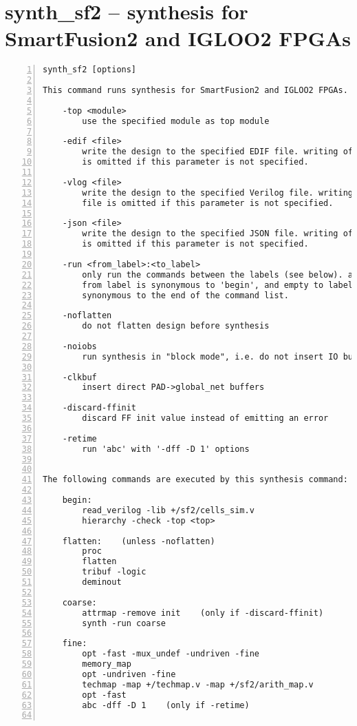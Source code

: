 \section{synth\_sf2 -- synthesis for SmartFusion2 and IGLOO2 FPGAs}
\label{cmd:synth_sf2}
\begin{lstlisting}[numbers=left,frame=single]
    synth_sf2 [options]

This command runs synthesis for SmartFusion2 and IGLOO2 FPGAs.

    -top <module>
        use the specified module as top module

    -edif <file>
        write the design to the specified EDIF file. writing of an output file
        is omitted if this parameter is not specified.

    -vlog <file>
        write the design to the specified Verilog file. writing of an output
        file is omitted if this parameter is not specified.

    -json <file>
        write the design to the specified JSON file. writing of an output file
        is omitted if this parameter is not specified.

    -run <from_label>:<to_label>
        only run the commands between the labels (see below). an empty
        from label is synonymous to 'begin', and empty to label is
        synonymous to the end of the command list.

    -noflatten
        do not flatten design before synthesis

    -noiobs
        run synthesis in "block mode", i.e. do not insert IO buffers

    -clkbuf
        insert direct PAD->global_net buffers

    -discard-ffinit
        discard FF init value instead of emitting an error

    -retime
        run 'abc' with '-dff -D 1' options


The following commands are executed by this synthesis command:

    begin:
        read_verilog -lib +/sf2/cells_sim.v
        hierarchy -check -top <top>

    flatten:    (unless -noflatten)
        proc
        flatten
        tribuf -logic
        deminout

    coarse:
        attrmap -remove init    (only if -discard-ffinit)
        synth -run coarse

    fine:
        opt -fast -mux_undef -undriven -fine
        memory_map
        opt -undriven -fine
        techmap -map +/techmap.v -map +/sf2/arith_map.v
        opt -fast
        abc -dff -D 1    (only if -retime)


\end{lstlisting}
